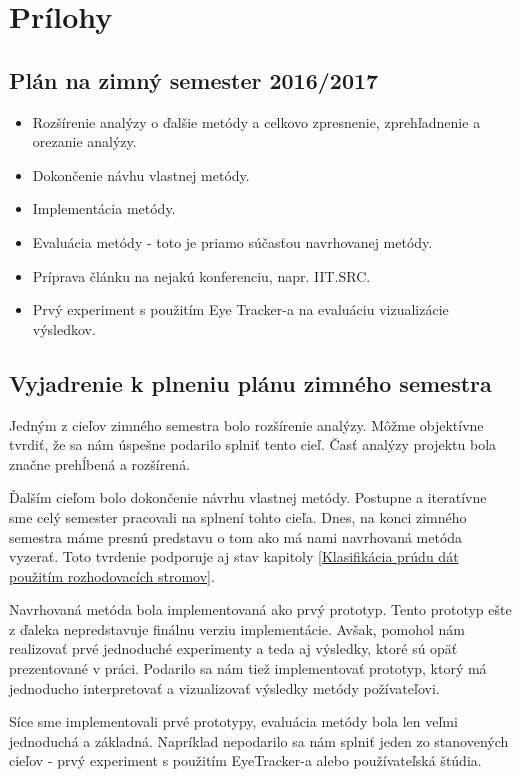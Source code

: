 \label{app.01}
\appendix
\chapter*{Prílohy}
\renewcommand{\thesection}{\Alph{section}}


\section{Plán na zimný semester 2016/2017}\label{plan-zima}
\begin{itemize}
	\item Rozšírenie analýzy o ďalšie metódy a celkovo zpresnenie, zprehľadnenie a orezanie analýzy.
	\item Dokončenie návhu vlastnej metódy.
	\item Implementácia metódy.
	\item Evaluácia metódy - toto je priamo súčasťou navrhovanej metódy.
	\item Príprava článku na nejakú konferenciu, napr. IIT.SRC.
	\item Prvý experiment s použitím Eye Tracker-a na evaluáciu vizualizácie výsledkov.
\end{itemize}

\section{Vyjadrenie k plneniu plánu zimného semestra}\label{plan-zima-vyjadrenie}
Jedným z cieľov zimného semestra bolo rozšírenie analýzy. Môžme objektívne tvrdiť, že sa nám úspešne podarilo splniť tento cieľ. Časť analýzy projektu bola značne prehĺbená a rozšírená.
\par
Ďalším cieľom bolo dokončenie návrhu vlastnej metódy. Postupne a iteratívne sme celý semester pracovali na splnení tohto cieľa. Dnes, na konci zimného semestra máme presnú predstavu o tom ako má nami navrhovaná metóda vyzerať. Toto tvrdenie podporuje aj stav kapitoly \ref{Klasifikácia prúdu dát použitím rozhodovacích stromov}.
\par
Navrhovaná metóda bola implementovaná ako prvý prototyp. Tento prototyp ešte z ďaleka nepredstavuje finálnu verziu implementácie. Avšak, pomohol nám realizovať prvé jednoduché experimenty a teda aj výsledky, ktoré sú opäť prezentované v práci. Podarilo sa nám tiež implementovať prototyp, ktorý má jednoducho interpretovať a vizualizovať výsledky metódy požívateľovi.
\par
Síce sme implementovali prvé prototypy, evaluácia metódy bola len veľmi jednoduchá a základná. Napríklad nepodarilo sa nám splniť jeden zo stanovených cieľov - prvý experiment s použitím EyeTracker-a alebo používateľská štúdia.

